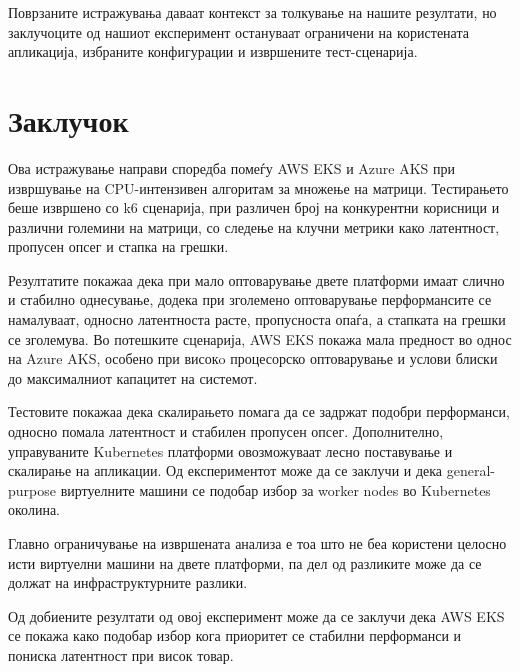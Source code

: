\documentclass{article}
\begin{document}
Поврзаните истражувања даваат контекст за толкување на нашите резултати, но заклучоците од нашиот експеримент остануваат ограничени на користената апликација, избраните конфигурации и извршените тест-сценарија.

\section{Заклучок}

Ова истражување направи споредба помеѓу AWS EKS и Azure AKS при извршување на CPU-интензивен алгоритам за множење на матрици. Тестирањето беше извршено со k6 сценарија, при различен број на конкурентни корисници и различни големини на матрици, со следење на клучни метрики како латентност, пропусен опсег и стапка на грешки.

Резултатите покажаа дека при мало оптоварување двете платформи имаат слично и стабилно однесување, додека при зголемено оптоварување перформансите се намалуваат, односно латентноста расте, пропусноста опаѓа, а стапката на грешки се зголемува. Во потешките сценарија, AWS EKS покажа мала предност во однос на Azure AKS, особено при високo процесорско оптоварување и услови блиски до максималниот капацитет на системот.

Тестовите покажаа дека скалирањето помага да се задржат подобри перформанси, односно помала латентност и стабилен пропусен опсег. Дополнително, управуваните Kubernetes платформи овозможуваат лесно поставување и скалирање на апликации. Од експериментот може да се заклучи и дека general-purpose виртуелните машини се подобар избор за worker nodes во Kubernetes околина.

Главно ограничување на извршената анализа е тоа што не беа користени целосно исти виртуелни машини на двете платформи, па дел од разликите може да се должат на инфраструктурните разлики.

Од добиените резултати од овој експеримент може да се заклучи дека AWS EKS се покажа како подобар избор кога приоритет се стабилни перформанси и пониска латентност при висок товар.
\end{document}
